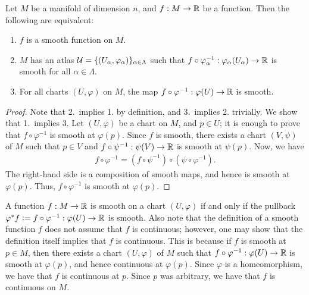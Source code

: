 \begin{proposition}
    Let $M$ be a manifold of dimension $n$, and $f:M \to \mathbb{R}$ be a function. Then the following are equivalent:
    \begin{enumerate}
        \item $f$ is a smooth function on $M$.
        \item $M$ has an atlas $\mathcal{U} = \{(U_{\alpha},\varphi_{\alpha})\}_{\alpha \in \Lambda}$ such that $f \circ \varphi_{\alpha}^{-1}:\varphi_{\alpha}(U_{\alpha}) \to \mathbb{R}$ is smooth for all $\alpha \in \Lambda$.
        \item For all charts $(U,\varphi)$ on $M$, the map $f \circ \varphi^{-1}:\varphi(U) \to \mathbb{R}$ is smooth.
    \end{enumerate}
\end{proposition}
\begin{proof}
    Note that 2.~implies 1. by definition, and 3.~implies 2. trivially. We show that 1.~implies 3. Let $(U,\varphi)$ be a chart on $M$, and $p \in U$; it is enough to prove that $f \circ \varphi^{-1}$ is smooth at $\varphi(p)$. Since $f$ is smooth, there exists a chart $(V,\psi)$ of $M$ such that $p \in V$ and $f \circ \psi^{-1}:\psi(V) \to \mathbb{R}$ is smooth at $\psi(p)$. Now, we have
    \begin{align}
        f \circ \varphi^{-1} = (f \circ \psi^{-1}) \circ (\psi \circ \varphi^{-1}).
    \end{align}
    The right-hand side is a composition of smooth maps, and hence is smooth at $\varphi(p)$. Thus, $f \circ \varphi^{-1}$ is smooth at $\varphi(p)$.
\end{proof}

A function $f:M \to \mathbb{R}$ is smooth on a chart $(U,\varphi)$ if and only if the pullback $\varphi^{\ast}f \vcentcolon= f \circ \varphi^{-1} :\varphi(U) \to \mathbb{R}$ is smooth. Also note that the definition of a smooth function $f$ does not assume that $f$ is continuous; however, one may show that the definition itself implies that $f$ is continuous. This is because if $f$ is smooth at $p \in M$, then there exists a chart $(U,\varphi)$ of $M$ such that $f \circ \varphi^{-1}:\varphi(U) \to \mathbb{R}$ is smooth at $\varphi(p)$, and hence continuous at $\varphi(p)$. Since $\varphi$ is a homeomorphism, we have that $f$ is continuous at $p$. Since $p$ was arbitrary, we have that $f$ is continuous on $M$.

